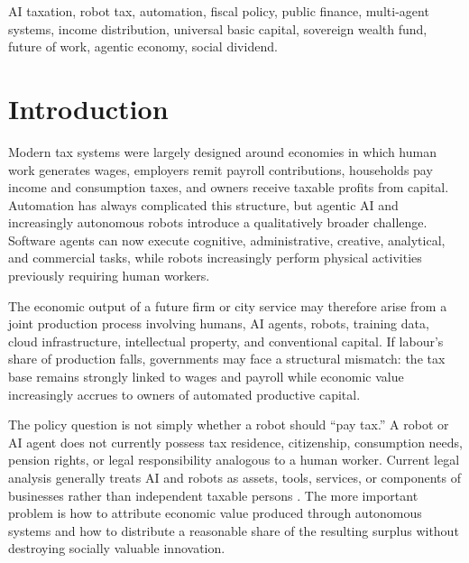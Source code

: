 \documentclass[conference]{IEEEtran}
\begin{document}
\begin{abstract}
The framework therefore changes the fiscal unit of analysis from ``taxing robots'' to \textit{taxing the economically attributable automation surplus at the owner/beneficiary level while socializing part of its long-run capital return}. A policy digital twin continuously stress-tests tax incidence, innovation effects, employment, inequality, revenue stability, and cross-border leakage before rates are adjusted. This provides a computational foundation for a tax-and-dividend system that can preserve public revenue and household purchasing power without treating AI agents or robots as fictional legal persons.
\end{abstract}

\begin{IEEEkeywords}
AI taxation, robot tax, automation, fiscal policy, public finance, multi-agent systems,
income distribution, universal basic capital, sovereign wealth fund, future of work,
agentic economy, social dividend.
\end{IEEEkeywords}

\section{Introduction}

Modern tax systems were largely designed around economies in which human work
generates wages, employers remit payroll contributions, households pay income
and consumption taxes, and owners receive taxable profits from capital.
Automation has always complicated this structure, but agentic AI and increasingly
autonomous robots introduce a qualitatively broader challenge. Software agents
can now execute cognitive, administrative, creative, analytical, and commercial
tasks, while robots increasingly perform physical activities previously requiring
human workers.

The economic output of a future firm or city service may therefore arise from a
joint production process involving humans, AI agents, robots, training data,
cloud infrastructure, intellectual property, and conventional capital. If
labour's share of production falls, governments may face a structural mismatch:
the tax base remains strongly linked to wages and payroll while economic value
increasingly accrues to owners of automated productive capital.

The policy question is not simply whether a robot should ``pay tax.'' A robot or
AI agent does not currently possess tax residence, citizenship, consumption
needs, pension rights, or legal responsibility analogous to a human worker.
Current legal analysis generally treats AI and robots as assets, tools, services,
or components of businesses rather than independent taxable persons
\cite{DimitropoulouAIIncome}. The more important problem is how to attribute
economic value produced through autonomous systems and how to distribute a
reasonable share of the resulting surplus without destroying socially valuable
innovation.
\end{document}
